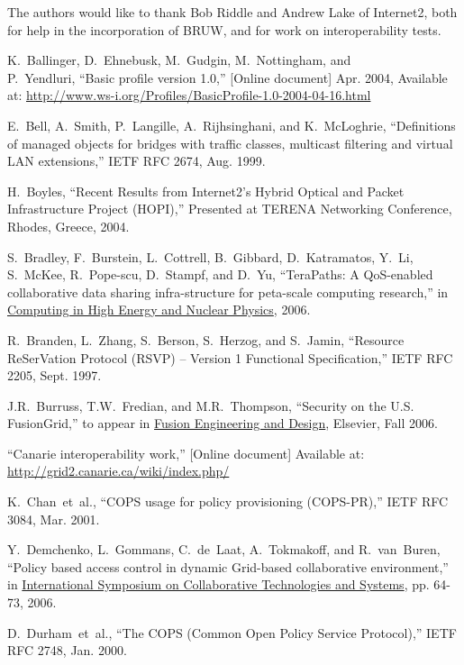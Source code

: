 \documentclass[conference]{IEEEtran}
\begin{document}
The authors would like to thank Bob Riddle and Andrew Lake of Internet2, both
for help in the incorporation of BRUW, and for work on interoperability tests.

\begin{thebibliography}{1}

K.~Ballinger, D.~Ehnebusk, M.~Gudgin, M.~Nottingham, and~~~~\\
P.~Yendluri, ``Basic profile version 1.0,'' [Online document] Apr. 2004,
Available at:
\url{http://www.ws-i.org/Profiles/BasicProfile-1.0-2004-04-16.html}

E.~Bell, A.~Smith, P.~Langille, A.~Rijhsinghani, and K.~McLoghrie,
``Definitions of managed objects for bridges with traffic classes, multicast
filtering and virtual LAN extensions,''
IETF RFC 2674, Aug. 1999.

H.~Boyles,
``Recent Results from Internet2's Hybrid Optical and Packet Infrastructure Project (HOPI),''
Presented at TERENA Networking Conference, Rhodes, Greece, 2004.

S.~Bradley, F.~Burstein, L.~Cottrell, B.~Gibbard, D.~Katramatos, Y.~Li,
S.~McKee, R.~Pope-scu, D.~Stampf, and D.~Yu,
``TeraPaths: A QoS-enabled collaborative data sharing infra-structure for
peta-scale computing research,''
in \underline{Computing in High Energy and Nuclear Physics}, 2006.

R.~Branden, L.~Zhang, S.~Berson, S.~Herzog, and S.~Jamin,
``Resource ReSerVation Protocol (RSVP) -- Version 1 Functional
Specification,'' IETF RFC 2205, Sept. 1997.

J.R.~Burruss, T.W.~Fredian, and M.R.~Thompson,
``Security on the U.S. FusionGrid,''
to appear in \underline{Fusion Engineering and Design}, Elsevier, Fall 2006.

``Canarie interoperability work,'' [Online document] Available at: \\
\url{http://grid2.canarie.ca/wiki/index.php/}

K.~Chan~et~al., ``COPS usage for policy provisioning (COPS-PR),''
IETF RFC 3084, Mar. 2001.

Y.~Demchenko, L.~Gommans, C.~de~Laat, A.~Tokmakoff, and R.~van~Buren,
``Policy based access control in dynamic Grid-based collaborative environment,''
in
\underline{International Symposium on Collaborative Technologies and Systems},
pp. 64-73, 2006.

D.~Durham~et~al.,
``The COPS (Common Open Policy Service Protocol),'' IETF RFC 2748, Jan. 2000.


\end{thebibliography}
\end{document}
